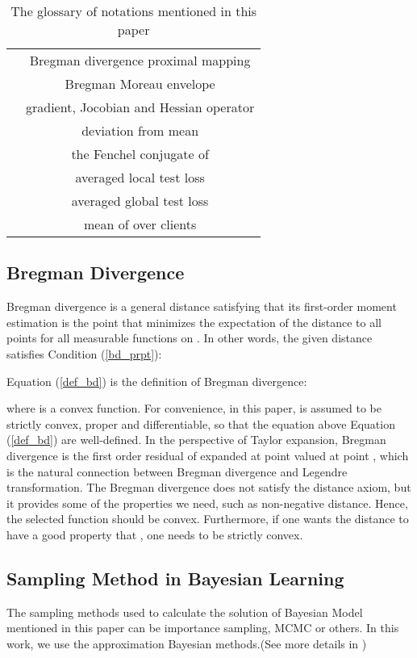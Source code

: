 \documentclass{article}
\begin{document}
\begin{table}[ht]
{\begin{tabular}{c|c}
         & Bregman divergence proximal mapping \\
         & Bregman Moreau envelope \\
         & gradient, Jocobian and Hessian operator \\
         & deviation from mean \\
         & the Fenchel conjugate of  \\
         & averaged local test loss \\
         & averaged global test loss \\
         & mean of  over clients \\   
    \end{tabular}}
    \caption{The glossary of notations mentioned in this paper}
    \label{appdx_tbl_glsry}
\end{table}

\subsection{Bregman Divergence}

Bregman divergence is a general distance satisfying that its first-order moment estimation is the point that minimizes the expectation of the distance to all points for all measurable functions on . In other words, the given distance  satisfies Condition (\ref{bd_prpt}):


Equation (\ref{def_bd}) is the definition of Bregman divergence:

where  is a convex function. For convenience, in this paper,  is assumed to be strictly convex, proper and differentiable, so that the equation above Equation (\ref{def_bd}) are well-defined. In the perspective of Taylor expansion, Bregman divergence is the first order residual of  expanded at point  valued at point , which is the natural connection between Bregman divergence and Legendre transformation. The Bregman divergence does not satisfy the distance axiom, but it provides some of the properties we need, such as non-negative distance. Hence, the selected function  should be convex. Furthermore, if one wants the distance to have a good property that , one needs  to be strictly convex.

\subsection{Sampling Method in Bayesian Learning}

The sampling methods used to calculate the solution of Bayesian Model mentioned in this paper can be importance sampling, MCMC or others. In this work, we use the approximation Bayesian methods.(See more details in \cite{andrieu2003introduction})
\end{document}
